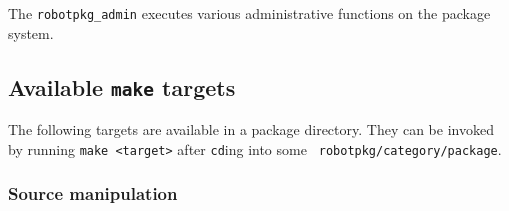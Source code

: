 The  {\tt robotpkg\_admin}  executes  various administrative  functions on  the
package system.

\subsection{Available {\tt make} targets} %
\label{section:using:targets}

The following targets are available in a package directory. They can be invoked
by   running  {\tt   make  <target>}   after   {\tt  cd}ing   into  some   {\tt
robotpkg/category/package}.

\subsubsection{Source manipulation}
